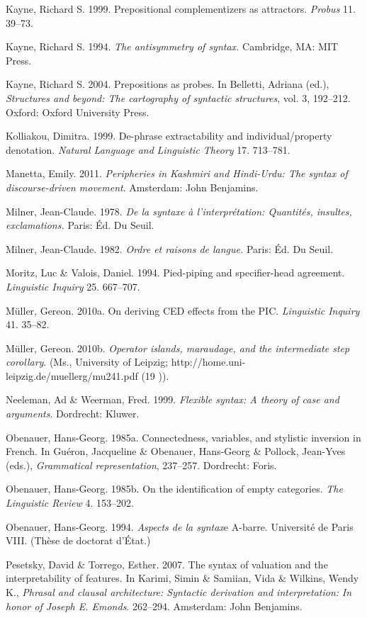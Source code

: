 \documentclass[output=paper]{langsci/langscibook}
\begin{document}
Kayne, Richard S. 1999. Prepositional complementizers as attractors. \textit{Probus} 11. 39–73.

Kayne, Richard S. 1994. \textit{The antisymmetry of syntax.} Cambridge, MA: MIT Press.

Kayne, Richard S. 2004. Prepositions as probes. In Belletti, Adriana (ed.), \textit{Structures and beyond: The cartography of syntactic structures}, vol. 3, 192–212. Oxford: Oxford University Press.

Kolliakou, Dimitra. 1999. De-phrase extractability and individual/property denotation. \textit{Natural Language and} \textit{Linguistic Theory} 17. 713–781.

Manetta, Emily. 2011. \textit{Peripheries in Kashmiri and Hindi-Urdu: The syntax of discourse-driven movement}. Amsterdam: John Benjamins.

Milner, Jean-Claude. 1978. \textit{De la syntaxe à l’interprétation: Quantités, insultes, exclamations.} Paris: Éd. Du Seuil.

Milner, Jean-Claude. 1982. \textit{Ordre et raisons de langue.} Paris: Éd. Du Seuil.

Moritz, Luc \& Valois, Daniel. 1994. Pied-piping and specifier-head agreement. \textit{Linguistic Inquiry} 25. 667–707.

Müller, Gereon. 2010a. On deriving CED effects from the PIC. \textit{Linguistic Inquiry} 41. 35–82.

Müller, Gereon. 2010b. \textit{Operator islands, maraudage, and the intermediate step corollary}. (Ms., University of Leipzig; http://home.uni-leipzig.de/muellerg/mu241.pdf (19 \citealt{May2016})).

Neeleman, Ad \& Weerman, Fred. 1999. \textit{Flexible syntax: A theory of case and arguments}. Dordrecht: Kluwer.

Obenauer, Hans-Georg. 1985a. Connectedness, variables, and stylistic inversion in French. In Guéron, Jacqueline \& Obenauer, Hans-Georg \& Pollock, Jean-Yves (eds.), \textit{Grammatical representation}, 237–257. Dordrecht: Foris.

Obenauer, Hans-Georg. 1985b. On the identification of empty categories. \textit{The Linguistic Review} 4. 153–202.

Obenauer, Hans-Georg. 1994. \textit{Aspects de la syntax}e A-barre. Université de Paris VIII. (Thèse de doctorat d’État.)

Pesetsky, David \& Torrego, Esther. 2007. The syntax of valuation and the interpretability of features. In Karimi, Simin \& Samiian, Vida \& Wilkins, Wendy K., \textit{Phrasal and clausal architecture: Syntactic derivation and interpretation:} \textit{In honor of Joseph E. Emonds}. 262–294. Amsterdam: John Benjamins.
\end{document}
